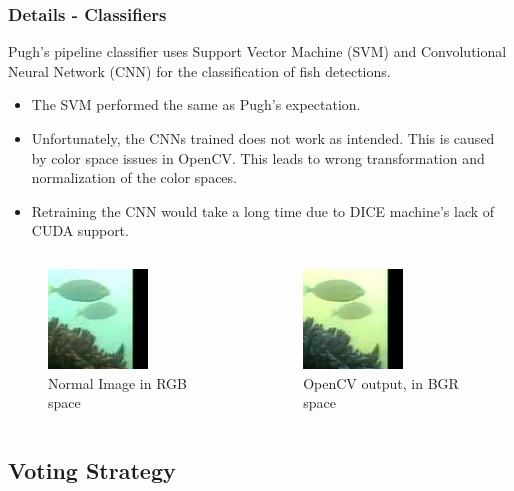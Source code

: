 \documentclass{beamer}[fullspacing]
\begin{document}
\begin{frame}
\frametitle{Details - Classifiers}

Pugh's pipeline classifier uses Support Vector Machine (SVM) and Convolutional Neural Network (CNN) for the classification of fish detections.

\begin{itemize}
\item
The SVM performed the same as Pugh's expectation.
\item
Unfortunately, the CNNs trained does not work as intended.
This is caused by color space issues in OpenCV. This leads to wrong transformation and normalization of the color spaces.
\item
Retraining the CNN would take a long time due to DICE machine's lack of CUDA support.
\end{itemize}

\begin{columns}
\setlength{\abovecaptionskip}{-2pt}
\begin{figure}
\includegraphics[scale=0.6]{image/outfile.jpg}
\caption{Normal Image in RGB space}
\end{figure}

\begin{figure}
\includegraphics[scale=0.6]{image/outfile2.jpg}
\caption{OpenCV output, in BGR space}
\end{figure}
\end{columns}

\end{frame}



\subsection{Voting Strategy}
\end{document}
